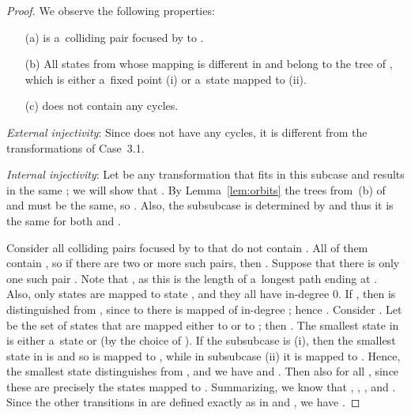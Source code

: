 \documentclass{amsart}
\begin{document}
\begin{proof}
We observe the following properties:
\begin{enumerate}
\item[(a)]  is a~colliding pair focused by  to .

\item[(b)] All states from  whose mapping is different in  and  belong to the tree of ,
which is either a~fixed point (i) or a~state mapped to  (ii).

\item[(c)]  does not contain any cycles.
\end{enumerate}

\textit{External injectivity}:
Since  does not have any cycles, it is different from the transformations of Case~3.1.

\textit{Internal injectivity}:
Let  be any transformation that fits in this subcase and results in the same ; we will show that .
By Lemma~\ref{lem:orbits} the trees from~(b) of  and  must be the same, so .
Also, the subsubcase is determined by  and thus it is the same for both  and .

Consider all colliding pairs focused by  to  that do not contain .
All of them contain , so if there are two or more such pairs, then .
Suppose that there is only one such pair .
Note that , as this is the length of a~longest path ending at .
Also, only states  are mapped to state , and they all have in-degree 0.
If , then  is distinguished from , since to  there is mapped  of in-degree ; hence .
Consider .
Let  be the set of states that are mapped either to  or to ; then .
The smallest state in  is either a~state  or  (by the choice of ).
If the subsubcase is (i), then the smallest state in  is  and so is mapped to , while in subsubcase (ii) it is  mapped to .
Hence, the smallest state distinguishes  from , and we have  and .
Then also  for all , since these are precisely the states mapped to .
Summarizing, we know that , , , and .
Since the other transitions in  are defined exactly as in  and , we have .


\end{proof}
\end{document}
